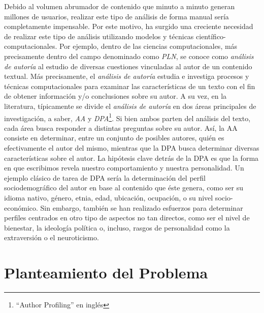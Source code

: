 Debido al volumen abrumador de contenido que minuto a minuto generan millones de usuarios,  realizar este tipo de análisis de forma manual sería completamente impensable. Por este motivo, ha surgido una creciente necesidad de realizar este tipo de análisis utilizando modelos y técnicas científico-computacionales.
Por ejemplo, dentro de las ciencias computacionales, más precisamente dentro del campo denominado como \emph{\ac{PLN}}, se conoce como \emph{análisis de autoría} al estudio de diversas cuestiones vinculadas al autor de un contenido textual\cite{indurkhya2010handbook}.
Más precisamente, el \emph{análisis de autoría} estudia e investiga procesos y técnicas computacionales para examinar las características de un texto con el fin de obtener información y/o conclusiones sobre su autor\cite{el2014authorship}.
A su vez, en la literatura\cite{zheng2003authorship,abbasi2005applying,zheng2006framework}, típicamente se divide el \emph{análisis de autoría} en dos áreas principales de investigación, a saber, \emph{\ac{AA}} y \emph{\ac{DPA}}\footnote{``Author Profiling'' en inglés}.
Si bien ambos parten del análisis del texto, cada área busca responder a distintas preguntas sobre su autor.
Así, la \ac{AA} consiste en determinar, entre un conjunto de posibles autores, quién es efectivamente el autor del mismo\cite{stamatatos2009survey}, mientras que la \ac{DPA} busca determinar diversas características sobre el autor\cite{argamon2009automatically}.
La hipótesis clave detrás de la \ac{DPA} es que la forma en que escribimos revela nuestro comportamiento y nuestra personalidad. 
Un ejemplo clásico de tarea de \ac{DPA} sería la determinación del perfil sociodemográfico del autor en base al contenido que éste genera, como ser su idioma nativo, género, etnia, edad, ubicación, ocupación, o su nivel socio-económico\cite{koppel2005determining,schler2006effects, corney2002gender}.
Sin embargo, también se han realizado esfuerzos para determinar perfiles centrados en otro tipo de aspectos no tan directos, como ser el nivel de bienestar\cite{schwartz2013characterizing}, la ideología política\cite{koppel2009automatically} o, incluso, rasgos de personalidad como la extraversión o el neuroticismo\cite{argamon2005lexical,mairesse2006words,rangel2015overview}.

\section{Planteamiento del Problema}

